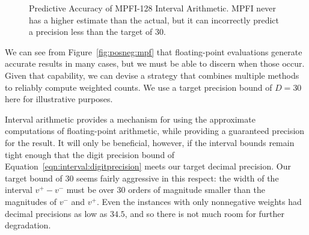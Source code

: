\documentclass{easychair}
\newcommand{\vmin}{v^{-}}
\newcommand{\vmax}{v^{+}}
\begin{document}
\begin{figure}
\caption{Predictive Accuracy of MPFI-128 Interval Arithmetic.  MPFI never has a higher estimate than the actual, but it can
incorrectly predict a precision less than the target of 30.}
\label{fig:mpfi}
\end{figure}

We can see from Figure~\ref{fig:posneg:mpf} that floating-point
evaluations generate accurate results in many cases, but we must be
able to discern when those occur.  Given that capability, we can
devise a strategy that combines multiple methods to reliably compute
weighted counts.  We use a target precision bound of $D=30$ here for
illustrative purposes.

Interval arithmetic provides a mechanism for using the approximate
computations of floating-point arithmetic, while providing a
guaranteed precision for the result.  It will only be beneficial,
however, if the interval bounds remain tight enough that the digit
precision bound of Equation~\ref{eqn:interval:digitprecision} meets
our target decimal precision.  Our target bound of 30 seems fairly
aggressive in this respect: the width of the interval $\vmax-\vmin$
must be over 30 orders of magnitude smaller than the magnitudes of
$\vmin$ and $\vmax$.  Even the instances with only nonnegative weights
had decimal precisions as low as $34.5$, and so there is not much
room for further degradation.
\end{document}
